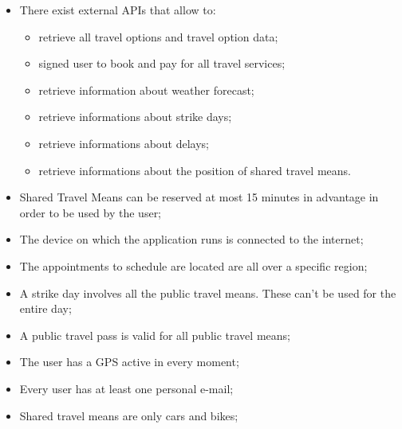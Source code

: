 \begin{itemize}

\item There exist external APIs that allow to:
\begin{itemize}
\item retrieve all travel options and travel option data;
\item signed user to book and pay for all travel services;
\item retrieve information about weather forecast;
\item retrieve informations about strike days;
\item retrieve informations about delays;
\item retrieve informations about the position of shared travel means.
\end{itemize}

\item Shared Travel Means can be reserved at most 15 minutes in advantage in order to be used by the user;

\item The device on which the application runs is connected to the internet;

\item The appointments to schedule are located are all over a specific region;

\item A strike day involves all the public travel means. These can't be used for the entire day;

\item A public travel pass is valid for all public travel means;

\item The user has a GPS active in every moment;

\item Every user has at least one personal e-mail;

\item Shared travel means are only cars and bikes;


\end{itemize}




